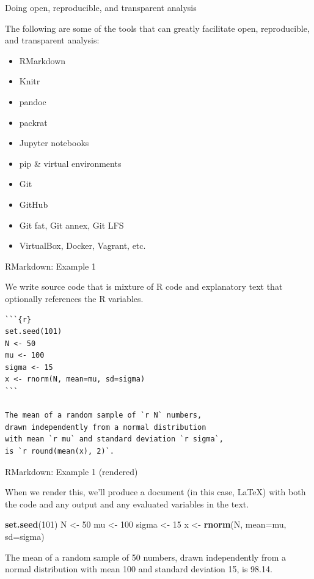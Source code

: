 \documentclass[10pt,ignorenonframetext,]{beamer}
\newenvironment{Shaded}{\begin{snugshade}}{\end{snugshade}}
\newcommand{\DataTypeTok}[1]{\textcolor[rgb]{0.13,0.29,0.53}{#1}}
\newcommand{\DecValTok}[1]{\textcolor[rgb]{0.00,0.00,0.81}{#1}}
\newcommand{\KeywordTok}[1]{\textcolor[rgb]{0.13,0.29,0.53}{\textbf{#1}}}
\newcommand{\NormalTok}[1]{#1}
\newcommand{\StringTok}[1]{\textcolor[rgb]{0.31,0.60,0.02}{#1}}
\providecommand{\tightlist}{%
  \setlength{\itemsep}{0pt}\setlength{\parskip}{0pt}}
\begin{document}
\begin{frame}{Doing open, reproducible, and transparent analysis}
\protect\hypertarget{doing-open-reproducible-and-transparent-analysis}{}

The following are some of the tools that can greatly facilitate open,
reproducible, and transparent analysis:

\begin{itemize}
\tightlist
\item
  RMarkdown
\item
  Knitr
\item
  pandoc
\item
  packrat
\item
  Jupyter notebooks
\item
  pip \& virtual environments
\item
  Git
\item
  GitHub
\item
  Git fat, Git annex, Git LFS
\item
  VirtualBox, Docker, Vagrant, etc.
\end{itemize}

\end{frame}

\begin{frame}[fragile]{RMarkdown: Example 1}
\protect\hypertarget{rmarkdown-example-1}{}

We write source code that is mixture of R code and explanatory text that
optionally references the R variables.

\begin{verbatim}
```{r}
set.seed(101)
N <- 50
mu <- 100
sigma <- 15
x <- rnorm(N, mean=mu, sd=sigma)
```

The mean of a random sample of `r N` numbers,
drawn independently from a normal distribution 
with mean `r mu` and standard deviation `r sigma`, 
is `r round(mean(x), 2)`.
\end{verbatim}

\end{frame}

\begin{frame}[fragile]{RMarkdown: Example 1 (rendered)}
\protect\hypertarget{rmarkdown-example-1-rendered}{}

When we render this, we’ll produce a document (in this case, \LaTeX)
with both the code and any output and any evaluated variables in the
text.

\begin{Shaded}
\begin{Highlighting}[]
\KeywordTok{set.seed}\NormalTok{(}\DecValTok{101}\NormalTok{)}
\NormalTok{N <-}\StringTok{ }\DecValTok{50}
\NormalTok{mu <-}\StringTok{ }\DecValTok{100}
\NormalTok{sigma <-}\StringTok{ }\DecValTok{15}
\NormalTok{x <-}\StringTok{ }\KeywordTok{rnorm}\NormalTok{(N, }\DataTypeTok{mean=}\NormalTok{mu, }\DataTypeTok{sd=}\NormalTok{sigma)}
\end{Highlighting}
\end{Shaded}

The mean of a random sample of 50 numbers, drawn independently from a
normal distribution with mean 100 and standard deviation 15, is 98.14.

\end{frame}
\end{document}
